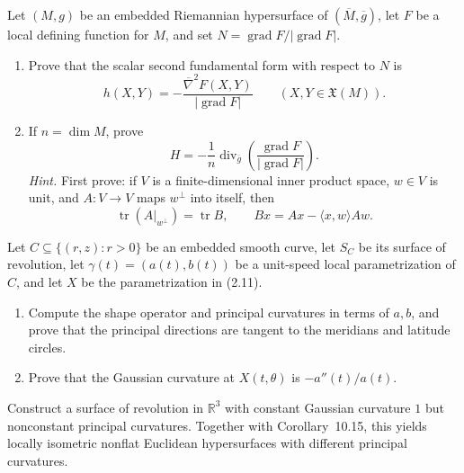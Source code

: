 \begin{exercise}
\label{prob:hypersurface-defining-function}

Let $(M,g)$ be an embedded Riemannian hypersurface of
$(\overline M,\overline g)$, let $F$ be a local defining function for $M$, and
set $N=\operatorname{grad}F/|\operatorname{grad}F|$.
\begin{enumerate}
\item[(a)] Prove that the scalar second fundamental form with respect to $N$
is
\[
h(X,Y)=-\frac{\overline\nabla^2F(X,Y)}{|\operatorname{grad}F|}
\qquad(X,Y\in\mathfrak X(M)).
\]
\item[(b)] If $n=\dim M$, prove
\[
H=-\frac1n\operatorname{div}_{\overline g}
\left(\frac{\operatorname{grad}F}{|\operatorname{grad}F|}\right).
\]
\emph{Hint.} First prove: if $V$ is a finite-dimensional inner product space,
$w\in V$ is unit, and $A:V\to V$ maps $w^\perp$ into itself, then
\[
\operatorname{tr}(A|_{w^\perp})=\operatorname{tr}B,
\qquad
Bx=Ax-\langle x,w\rangle Aw.
\]
\end{enumerate}
\end{exercise}

\begin{exercise}
\label{prob:surface-revolution-shape-principal-curvatures}

Let $C\subseteq\{(r,z):r>0\}$ be an embedded smooth curve, let $S_C$ be its
surface of revolution, let $\gamma(t)=(a(t),b(t))$ be a unit-speed local
parametrization of $C$, and let $X$ be the parametrization in (2.11).
\begin{enumerate}
\item[(a)] Compute the shape operator and principal curvatures in terms of
$a,b$, and prove that the principal directions are tangent to the meridians
and latitude circles.
\item[(b)] Prove that the Gaussian curvature at $X(t,\theta)$ is
$-a''(t)/a(t)$.
\end{enumerate}
\end{exercise}

\begin{exercise}
\label{prob:surface-revolution-constant-gaussian-curvature}

Construct a surface of revolution in $\mathbb R^3$ with constant Gaussian
curvature $1$ but nonconstant principal curvatures. Together with
Corollary~10.15, this yields locally isometric nonflat Euclidean hypersurfaces
with different principal curvatures.
\end{exercise}

